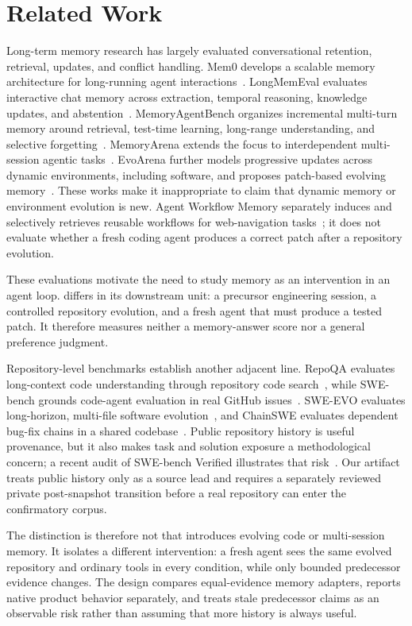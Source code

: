 \section{Related Work}

Long-term memory research has largely evaluated conversational retention,
retrieval, updates, and conflict handling. Mem0 develops a scalable memory
architecture for long-running agent interactions~\cite{chhikara2025mem0}.
LongMemEval evaluates interactive chat memory across extraction, temporal
reasoning, knowledge updates, and abstention~\cite{wu2024longmemeval}.
MemoryAgentBench organizes incremental multi-turn memory around retrieval,
test-time learning, long-range understanding, and selective forgetting~\cite{hu2025memoryagentbench}. MemoryArena extends the focus to interdependent
multi-session agentic tasks~\cite{he2026memoryarena}. EvoArena further models
progressive updates across dynamic environments, including software, and
proposes patch-based evolving memory~\cite{xu2026evoarena}. These works make it
inappropriate to claim that dynamic memory or environment evolution is new.
Agent Workflow Memory separately induces and selectively retrieves reusable
workflows for web-navigation tasks~\cite{wang2024agentworkflowmemory}; it does
not evaluate whether a fresh coding agent produces a correct patch after a
repository evolution.

These evaluations motivate the need to study memory as an intervention in an
agent loop. \bench{} differs in its downstream unit: a precursor engineering
session, a controlled repository evolution, and a fresh agent that must produce
a tested patch. It therefore measures neither a memory-answer score nor a
general preference judgment.

Repository-level benchmarks establish another adjacent line. RepoQA evaluates
long-context code understanding through repository code search~\cite{liu2024repoqa}, while SWE-bench grounds code-agent evaluation in real
GitHub issues~\cite{jimenez2023swebench}. SWE-EVO evaluates long-horizon,
multi-file software evolution~\cite{le2025sweevo}, and ChainSWE evaluates
dependent bug-fix chains in a shared codebase~\cite{jin2026chainswe}. Public repository history is useful
provenance, but it also makes task and solution exposure a methodological
concern; a recent audit of SWE-bench Verified illustrates that risk~\cite{openai2026swebench}. Our artifact treats public history only as a source lead and requires
a separately reviewed private post-snapshot transition before a real repository
can enter the confirmatory corpus.

The distinction is therefore not that \bench{} introduces evolving code or
multi-session memory. It isolates a different intervention: a fresh agent sees
the same evolved repository and ordinary tools in every condition, while only
bounded predecessor evidence changes. The design compares equal-evidence memory
adapters, reports native product behavior separately, and treats stale
predecessor claims as an observable risk rather than assuming that more history
is always useful.
